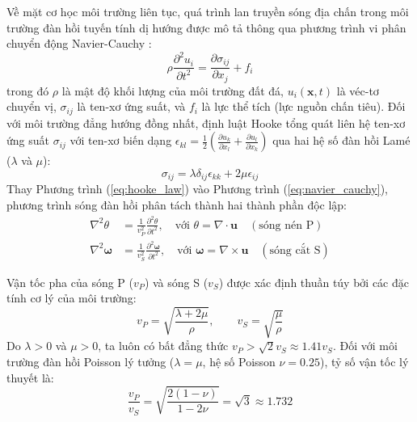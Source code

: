 \documentclass[preprint,1p]{elsarticle}
\begin{document}
Về mặt cơ học môi trường liên tục, quá trình lan truyền sóng địa chấn trong môi trường đàn hồi tuyến tính dị hướng được mô tả thông qua phương trình vi phân chuyển động Navier-Cauchy \cite{aki2002quantitative}:
\begin{equation}
\rho \frac{\partial^2 u_i}{\partial t^2} = \frac{\partial \sigma_{ij}}{\partial x_j} + f_i
\label{eq:navier_cauchy}
\end{equation}
trong đó $\rho$ là mật độ khối lượng của môi trường đất đá, $u_i(\mathbf{x}, t)$ là véc-tơ chuyển vị, $\sigma_{ij}$ là ten-xơ ứng suất, và $f_i$ là lực thể tích (lực nguồn chấn tiêu). Đối với môi trường đẳng hướng đồng nhất, định luật Hooke tổng quát liên hệ ten-xơ ứng suất $\sigma_{ij}$ với ten-xơ biến dạng $\epsilon_{kl} = \frac{1}{2}\left(\frac{\partial u_k}{\partial x_l} + \frac{\partial u_l}{\partial x_k}\right)$ qua hai hệ số đàn hồi Lamé ($\lambda$ và $\mu$):
\begin{equation}
\sigma_{ij} = \lambda \delta_{ij} \epsilon_{kk} + 2\mu \epsilon_{ij}
\label{eq:hooke_law}
\end{equation}
Thay Phương trình (\ref{eq:hooke_law}) vào Phương trình (\ref{eq:navier_cauchy}), phương trình sóng đàn hồi phân tách thành hai thành phần độc lập:
\begin{align}
\nabla^2 \theta &= \frac{1}{v_P^2} \frac{\partial^2 \theta}{\partial t^2}, \quad \text{với } \theta = \nabla \cdot \mathbf{u} \quad (\text{sóng nén P}) \label{eq:p_wave_eq} \\
\nabla^2 \bm{\omega} &= \frac{1}{v_S^2} \frac{\partial^2 \bm{\omega}}{\partial t^2}, \quad \text{với } \bm{\omega} = \nabla \times \mathbf{u} \quad (\text{sóng cắt S}) \label{eq:s_wave_eq}
\end{align}

Vận tốc pha của sóng P ($v_P$) và sóng S ($v_S$) được xác định thuần túy bởi các đặc tính cơ lý của môi trường:
\begin{equation}
v_P = \sqrt{\frac{\lambda + 2\mu}{\rho}}, \qquad v_S = \sqrt{\frac{\mu}{\rho}}
\label{eq:velocities}
\end{equation}
Do $\lambda > 0$ và $\mu > 0$, ta luôn có bất đẳng thức $v_P > \sqrt{2} v_S \approx 1.41 v_S$. Đối với môi trường đàn hồi Poisson lý tưởng ($\lambda = \mu$, hệ số Poisson $\nu = 0.25$), tỷ số vận tốc lý thuyết là:
\begin{equation}
\frac{v_P}{v_S} = \sqrt{\frac{2(1 - \nu)}{1 - 2\nu}} = \sqrt{3} \approx 1.732
\label{eq:vp_vs_ratio}
\end{equation}
\end{document}
